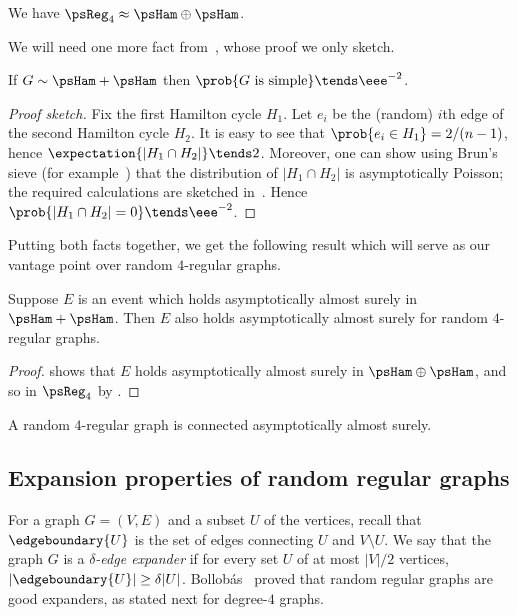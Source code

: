 \begin{theorem} \label{thm:kim-wormald}
 We have $\psReg_4 \approx \psHam \oplus \psHam$.
\end{theorem}

We will need one more fact from~\cite{KW}, whose proof we only sketch.

\begin{lemma} \label{lem:ham}
 If $G \sim \psHam + \psHam$ then $\prob{G \text{ is simple}} \tends \eee^{-2}$.
\end{lemma}
\begin{proof}[Proof sketch]
 Fix the first Hamilton cycle $H_1$. Let $e_i$ be the (random) $i$th edge of the second Hamilton cycle $H_2$. It is easy to see that $\prob{e_i \in H_1} = 2/(n-1)$, hence $\expectation{|H_1 \cap H_2|} \tends 2$. Moreover, one can show using Brun's sieve (for example~\cite[Theorem 8.3.1]{AS}) that the distribution of $|H_1 \cap H_2|$ is asymptotically Poisson; the required calculations are sketched in~\cite[\S 2(iii)]{KW}. Hence $\prob{|H_1 \cap H_2| = 0} \tends \eee^{-2}$.
\end{proof}

Putting both facts together, we get the following result which will serve as our vantage point over random $4$-regular graphs.

\begin{lemma} \label{lem:model}
 Suppose $E$ is an event which holds asymptotically almost surely in $\psHam + \psHam$. Then $E$ also holds asymptotically almost surely for random $4$-regular graphs.
\end{lemma}
\begin{proof}
  shows that $E$ holds asymptotically almost surely in $\psHam \oplus \psHam$, and so in $\psReg_4$ by .
\end{proof}

\begin{corollary} \label{cor:connected}
 A random $4$-regular graph is connected asymptotically almost surely.
\end{corollary}

\subsection{Expansion properties of random regular graphs}

For a graph $G=(V,E)$ and a subset $U$ of the vertices, recall that $\edgeboundary{U}$ is the set of edges connecting $U$ and $V \setminus U$. We say that the graph $G$ is a \emph{$\delta$-edge expander} if for every set $U$ of at most $|V|/2$ vertices, $|\edgeboundary{U}| \geq \delta |U|$. Bollob\'as~\cite{Bollobas88Isoperimetric} proved that random regular graphs are good expanders, as stated next for degree-$4$ graphs.

